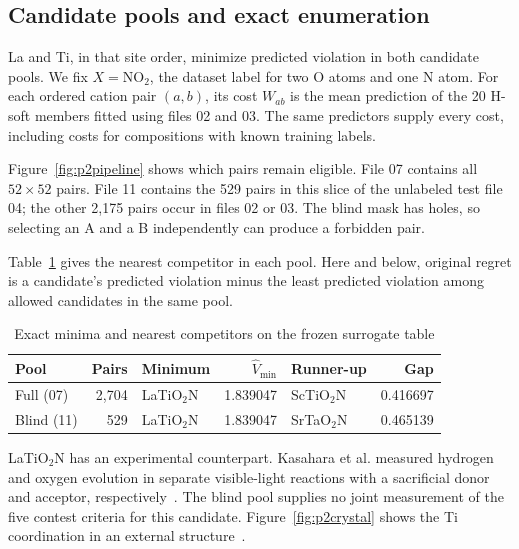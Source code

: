 \subsection{Candidate pools and exact enumeration}\label{sec:p2pools}
La and Ti, in that site order, minimize predicted violation in both candidate pools. We fix $X=\mathrm{NO_2}$, the dataset label for two O atoms and one N atom. For each ordered cation pair $(a,b)$, its cost $W_{ab}$ is the mean prediction of the 20 H-soft members fitted using files 02 and 03. The same predictors supply every cost, including costs for compositions with known training labels.

Figure~\ref{fig:p2pipeline} shows which pairs remain eligible. File 07 contains all $52\times52$ pairs. File 11 contains the 529 pairs in this slice of the unlabeled test file 04; the other 2,175 pairs occur in files 02 or 03. The blind mask has holes, so selecting an A and a B independently can produce a forbidden pair.

Table~\ref{tab:p2pools} gives the nearest competitor in each pool. Here and below, original regret is a candidate's predicted violation minus the least predicted violation among allowed candidates in the same pool.
\begin{table}[!htb]
\centering
\caption{Exact minima and nearest competitors on the frozen surrogate table}\label{tab:p2pools}
\begin{tabular}{@{}lrlrlr@{}}
\toprule
Pool & Pairs & Minimum & $\widehat V_{\min}$ & Runner-up & Gap\\
\midrule
Full (07) & 2,704 & LaTiO$_2$N & 1.839047 & ScTiO$_2$N & 0.416697\\
Blind (11) & 529 & LaTiO$_2$N & 1.839047 & SrTaO$_2$N & 0.465139\\
\bottomrule
\end{tabular}
\end{table}

LaTiO$_2$N has an experimental counterpart. Kasahara et al. measured hydrogen and oxygen evolution in separate visible-light reactions with a sacrificial donor and acceptor, respectively~\cite{kasahara2002}. The blind pool supplies no joint measurement of the five contest criteria for this candidate. Figure~\ref{fig:p2crystal} shows the Ti coordination in an external structure~\cite{mp1222738}.
\FloatBarrier

